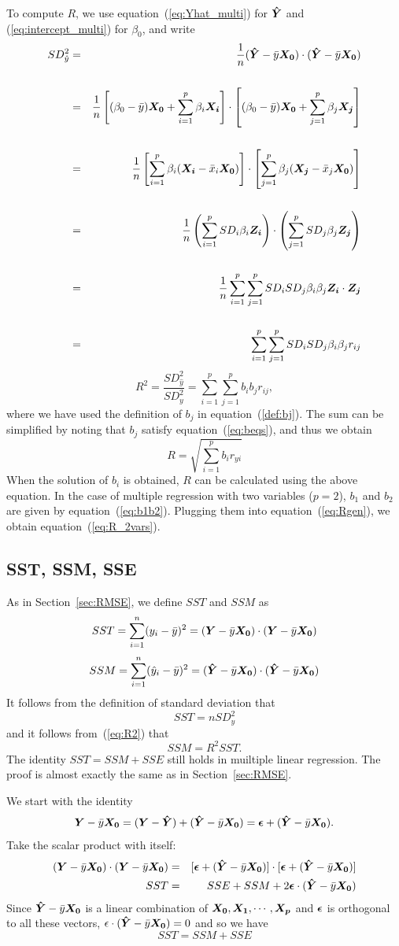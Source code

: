 \documentclass[11pt]{article}
\newcommand{\beq}{\begin{equation}}
\newcommand{\eeq}{\end{equation}}
\newcommand{\beqn}{\begin{eqnarray}}
\newcommand{\eeqn}{\end{eqnarray}}
\newcommand{\ve}[1]{\mbox{\boldmath $#1$}}
\begin{document}
To compute $R$, we use equation~(\ref{eq:Yhat_multi}) for $\ve{\hat{Y}}$ and 
(\ref{eq:intercept_multi}) for $\beta_0$, and write 
\beqn
  SD_{\hat{y}}^2 &=& \frac{1}{n} (\ve{\hat{Y}}-\bar{y} \ve{X_0})\cdot 
(\ve{\hat{Y}}-\bar{y} \ve{X_0}) \cr \cr 
&=& \frac{1}{n}\left[ (\beta_0-\bar{y}) \ve{X_0} + \sum_{i=1}^p \beta_i \ve{X_i}\right] \cdot 
\left[ (\beta_0-\bar{y}) \ve{X_0} + \sum_{j=1}^p \beta_j \ve{X_j}\right] \cr \cr 
&=&\frac{1}{n} \left[ \sum_{i=1}^p \beta_i (\ve{X_i}-\bar{x}_i \ve{X_0})\right] \cdot 
\left[ \sum_{j=1}^p \beta_j (\ve{X_j}-\bar{x}_j \ve{X_0})\right] \cr \cr 
&=&\frac{1}{n} \left( \sum_{i=1}^p SD_i \beta_i \ve{Z_i}\right) \cdot 
\left( \sum_{j=1}^p SD_j \beta_j \ve{Z_j}\right) \cr \cr 
&=&\frac{1}{n} \sum_{i=1}^p \sum_{j=1}^p SD_i SD_j \beta_i \beta_j  \ve{Z_i}\cdot \ve{Z_j} \cr \cr 
&=& \sum_{i=1}^p \sum_{j=1}^p SD_i SD_j \beta_i \beta_j r_{ij} \nonumber
\eeqn
\[
  R^2 = \frac{SD_{\hat{y}}^2}{SD_y^2} = \sum_{i=1}^p \sum_{j=1}^p b_i b_j r_{ij} ,
\]
where we have used the definition of $b_j$ in equation~(\ref{def:bj}). The sum 
can be simplified by noting that $b_j$ satisfy equation~(\ref{eq:beqs}), and thus 
we obtain 
\beq
  \boxed{ R = \sqrt{\sum_{i=1}^p b_i r_{yi} } }
\label{eq:Rgen}
\eeq
When the solution of $b_i$ is obtained, $R$ can be calculated using the above equation. 
In the case of multiple regression with two variables ($p=2$), $b_1$ and $b_2$ 
are given by equation~(\ref{eq:b1b2}). Plugging them into equation~(\ref{eq:Rgen}), 
we obtain equation~(\ref{eq:R_2vars}).

\subsection{SST, SSM, SSE}
\label{sec:RMSE_multi}

As in Section~\ref{sec:RMSE}, we define $SST$ and $SSM$ as 
\[
  SST = \sum_{i=1}^n (y_i-\bar{y})^2 = (\ve{Y}-\bar{y} \ve{X_0}) \cdot (\ve{Y}-\bar{y} \ve{X_0})
\]
\[
 SSM = \sum_{i=1}^n (\hat{y}_i-\bar{y})^2 = (\ve{\hat{Y}}-\bar{y}\ve{X_0})\cdot (\ve{\hat{Y}}-\bar{y}\ve{X_0})
\]
It follows from the definition of standard deviation that 
\beq
  SST = n SD_y^2 
\label{eq:SST_multi}
\eeq
and it follows from~(\ref{eq:R2}) that 
\beq
  SSM = R^2 SST .
\label{eq:SSM_multi}
\eeq
The identity $SST=SSM+SSE$ still holds in muiltiple linear regression. The proof 
is almost exactly the same as in Section~\ref{sec:RMSE}. 

We start with the identity 
\[
  \ve{Y}-\bar{y} \ve{X_0} = (\ve{Y}-\ve{\hat{Y}}) + (\ve{\hat{Y}}-\bar{y}\ve{X_0}) 
= \ve{\epsilon} + (\ve{\hat{Y}}-\bar{y}\ve{X_0}) .
\]
Take the scalar product with itself:
\beqn
  (\ve{Y}-\bar{y} \ve{X_0})\cdot (\ve{Y}-\bar{y} \ve{X_0}) &=& 
  [\ve{\epsilon} + (\ve{\hat{Y}}-\bar{y}\ve{X_0})]\cdot 
[\ve{\epsilon} + (\ve{\hat{Y}}-\bar{y}\ve{X_0})] \cr 
SST &=& SSE + SSM + 2 \ve{\epsilon} \cdot (\ve{\hat{Y}}-\bar{y}\ve{X_0})  
\nonumber
\eeqn
Since $\ve{\hat{Y}}-\bar{y}\ve{X_0}$ is a linear combination of 
$\ve{X_0},\ve{X_1},\cdots, \ve{X_p}$ and $\ve{\epsilon}$ is orthogonal 
to all these vectors, $\epsilon \cdot (\ve{\hat{Y}}-\bar{y}\ve{X_0})=0$ and 
so we have 
\beq
  \boxed{ SST = SSM + SSE} 
\label{eq:SSTequality_multi} 
\eeq
\end{document}
